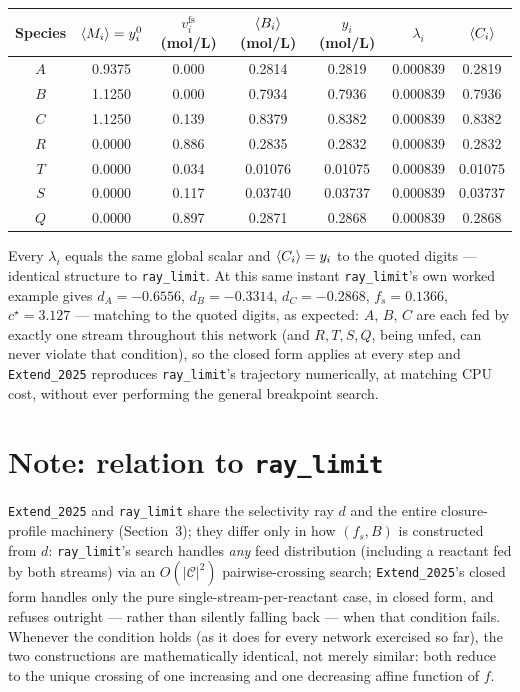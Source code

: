 \documentclass[11pt]{article}
\newcommand{\fs}{f_s}
\DeclarePairedDelimiter{\avg}{\langle}{\rangle}
\begin{document}
\begin{center}\small
\begin{tabular}{c|cccccc}
\toprule
Species & \(\avg{M_i}=y^0_i\) & \(v^{\mathrm{fs}}_i\) (mol/L) &
\(\avg{B_i}\) (mol/L) & \(y_i\) (mol/L) & \(\lambda_i\) & \(\avg{C_i}\) \\\midrule
\(A\) & 0.9375 & 0.000 & 0.2814 & 0.2819 & 0.000839 & 0.2819 \\
\(B\) & 1.1250 & 0.000 & 0.7934 & 0.7936 & 0.000839 & 0.7936 \\
\(C\) & 1.1250 & 0.139 & 0.8379 & 0.8382 & 0.000839 & 0.8382 \\
\(R\) & 0.0000 & 0.886 & 0.2835 & 0.2832 & 0.000839 & 0.2832 \\
\(T\) & 0.0000 & 0.034 & 0.01076 & 0.01075 & 0.000839 & 0.01075 \\
\(S\) & 0.0000 & 0.117 & 0.03740 & 0.03737 & 0.000839 & 0.03737 \\
\(Q\) & 0.0000 & 0.897 & 0.2871 & 0.2868 & 0.000839 & 0.2868 \\
\bottomrule
\end{tabular}
\end{center}

Every \(\lambda_i\) equals the same global scalar and \(\avg{C_i}=y_i\) to the quoted
digits --- identical structure to \texttt{ray\_limit}. At this same instant
\texttt{ray\_limit}'s own worked example gives \(d_A=-0.6556\), \(d_B=-0.3314\),
\(d_C=-0.2868\), \(\fs=0.1366\), \(c^{\star}=3.127\) --- matching to the quoted digits,
as expected: \(A\), \(B\), \(C\) are each fed by exactly one stream throughout this
network (and \(R,T,S,Q\), being unfed, can never violate that condition), so the closed
form applies at every step and \texttt{Extend\_2025} reproduces \texttt{ray\_limit}'s
trajectory numerically, at matching CPU cost, without ever performing the general
breakpoint search.

\section*{Note: relation to \texttt{ray\_limit}}

\texttt{Extend\_2025} and \texttt{ray\_limit} share the selectivity ray \(d\) and the
entire closure-profile machinery (Section~3); they differ only in how \((\fs, B)\) is
constructed from \(d\): \texttt{ray\_limit}'s search handles \emph{any} feed
distribution (including a reactant fed by both streams) via an
\(O(|\mathcal{C}|^2)\) pairwise-crossing search; \texttt{Extend\_2025}'s closed form
handles only the pure single-stream-per-reactant case, in closed form, and refuses
outright --- rather than silently falling back --- when that condition fails. Whenever
the condition holds (as it does for every network exercised so far), the two
constructions are mathematically identical, not merely similar: both reduce to the
unique crossing of one increasing and one decreasing affine function of \(f\).
\end{document}
